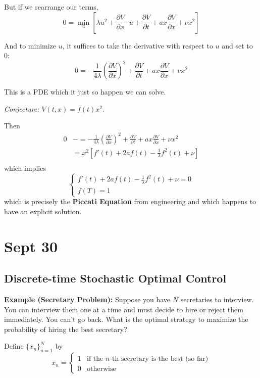 \documentclass[12pt]{report}
\begin{document}
        But if we rearrange our terms, 
        \[ 0 = \min_u \left[\lambda u^2 + \frac{\partial V}{\partial x}\cdot u + \frac{\partial V}{\partial t} + ax \frac{\partial V}{\partial x} + \nu x^2\right]\]
        
        And to minimize $u$, it suffices to take the derivative with respect to $u$ and set to 0:
        \[0 = -\frac{1}{4\lambda} \left(\frac{\partial V}{\partial x}\right)^2 + \frac{\partial V}{\partial t} + ax \frac{\partial V}{\partial x} + \nu x^2\]
        
        This is a PDE which it just so happen we can solve. 

        \emph{Conjecture:} $V(t, x) = f(t) x^2$. 

        Then 
        \begin{align*}
            0 &-= -\frac{1}{4\lambda} \left(\frac{\partial V}{\partial x}\right)^2 + \frac{\partial V}{\partial t} + ax \frac{\partial V}{\partial x} + \nu x^2\\ 
            &= x^2 \left[f'(t) + 2af(t) - \frac{1}{\lambda} f^2(t) + \nu\right]\\ 
        \end{align*}
        which implies 
        \[\begin{cases}
            f'(t) + 2af(t) - \frac{1}{\lambda} f^2(t) + \nu = 0\\ 
            f(T) = 1
        \end{cases}\]
        which is precisely the \textbf{Piccati Equation} from engineering and which happens to have an explicit solution. 

\section{Sept 30}
    \subsection*{Discrete-time Stochastic Optimal Control}
        \textbf{Example (Secretary Problem):} Suppose you have $N$ secretaries to interview. You can interview them one at a time and must decide to hire or reject them immediately. You can't go back. What is the optimal strategy to maximize the probability of hiring the best secretary?

        Define $\{x_{n}\}_{n=1}^N$ by 
        \[x_n = \begin{cases}
            1 & \text{if the $n$-th secretary is the best (so far)}\\
            0 & \text{otherwise}
        \end{cases}\]
\end{document}
